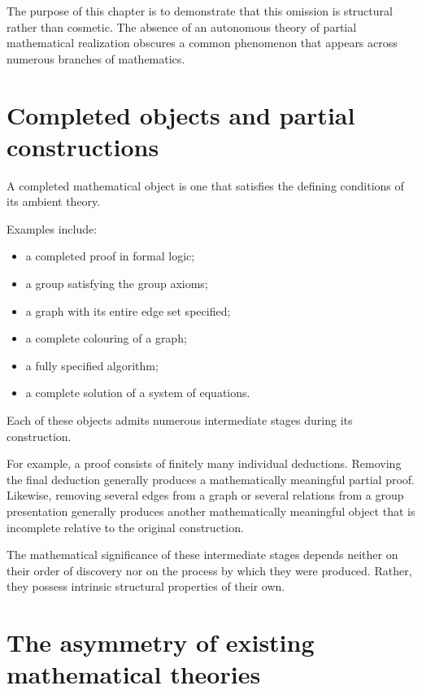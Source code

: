 \documentclass[13pt,openany]{book}
\theoremstyle{plain}
\theoremstyle{definition}
\begin{document}
The purpose of this chapter is to demonstrate that this omission is structural
rather than cosmetic. The absence of an autonomous theory of partial
mathematical realization obscures a common phenomenon that appears across
numerous branches of mathematics.


\section{Completed objects and partial constructions}

A completed mathematical object is one that satisfies the defining conditions of
its ambient theory.

Examples include:

\begin{itemize}
\item a completed proof in formal logic;
\item a group satisfying the group axioms;
\item a graph with its entire edge set specified;
\item a complete colouring of a graph;
\item a fully specified algorithm;
\item a complete solution of a system of equations.
\end{itemize}

Each of these objects admits numerous intermediate stages during its
construction.

For example, a proof consists of finitely many individual deductions.
Removing the final deduction generally produces a mathematically meaningful
partial proof. Likewise, removing several edges from a graph or several
relations from a group presentation generally produces another mathematically
meaningful object that is incomplete relative to the original construction.

The mathematical significance of these intermediate stages depends neither on
their order of discovery nor on the process by which they were produced.
Rather, they possess intrinsic structural properties of their own.


\section{The asymmetry of existing mathematical theories}
\end{document}
